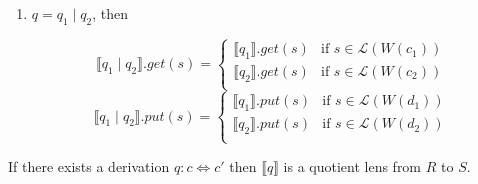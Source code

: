 \documentclass{svproc}
\begin{document}
\begin{enumerate}
  \item
  $q = q_1 \; | \; q_2$, then
      \begin{prooftree}
\end{prooftree}
  $$
  \llbracket q_1 \; | \; q_2 \rrbracket.get(s) = 
  \begin{cases}
  \llbracket q_1 \rrbracket.get (s) & \text{if } s \in \mathcal{L}(W(c_1))\\
  \llbracket q_2 \rrbracket.get (s) & \text{if } s \in \mathcal{L}(W(c_2))\\
  \end{cases}$$
  $$\llbracket q_1 \; | \; q_2 \rrbracket.put(s) = 
  \begin{cases}
  \llbracket q_1 \rrbracket.put (s) & \text{if } s \in \mathcal{L}(W(d_1))\\
  \llbracket q_2 \rrbracket.put (s) & \text{if } s \in \mathcal{L}(W(d_2))\\
  \end{cases}
  $$
\end{enumerate}

\begin{claim}
If there exists a derivation $q:c \Leftrightarrow c'$ then
$\llbracket q \rrbracket$ is a quotient lens from $R$ to $S$.
\end{claim}
\end{document}
